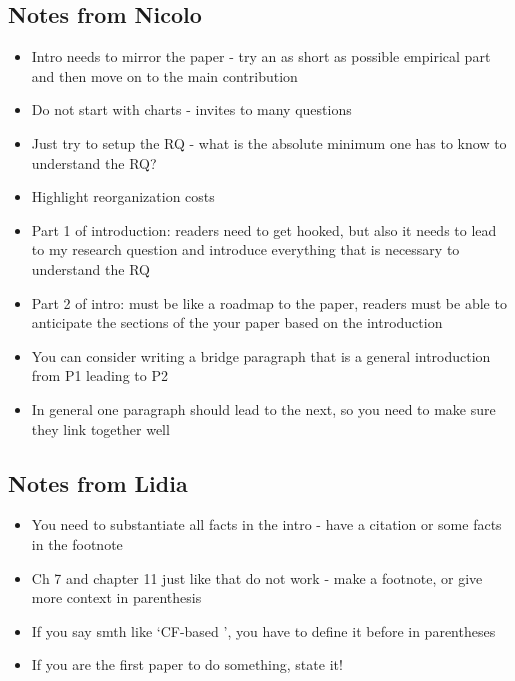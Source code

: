 \documentclass[12pt]{article}
\begin{document}
\subsection*{Notes from Nicolo} 
\begin{itemize} \setlength\itemsep{0em}  \small
    \item Intro needs to mirror the paper - try an as short as possible empirical part and then move on to the main contribution
    \item Do not start with charts - invites to many questions 
    \item Just try to setup the RQ - what is the absolute minimum one has to know to understand the RQ? 
    \item Highlight reorganization costs
    \item Part 1 of introduction: readers need to get hooked, but also it needs to lead to my research question and introduce everything that is necessary to understand the RQ
    \item Part 2 of intro: must be like a roadmap to the paper, readers must be able to anticipate the sections of the your paper based on the introduction
    \item You can consider writing a bridge paragraph that is a general introduction from P1 leading to P2
    \item In general one paragraph should lead to the next, so you need to make sure they link together well
\end{itemize} \normalsize

\subsection*{Notes from Lidia} 
\begin{itemize} \setlength\itemsep{0em}  \small
    \item You need to substantiate all facts in the intro - have a citation or some facts in the footnote
    \item Ch 7 and chapter 11 just like that do not work - make a footnote, or give more context in parenthesis
    \item If you say smth like `CF-based ', you have to define it before in parentheses
    \item If you are the first paper to do something, state it! 
\end{itemize} \normalsize
\end{document}
